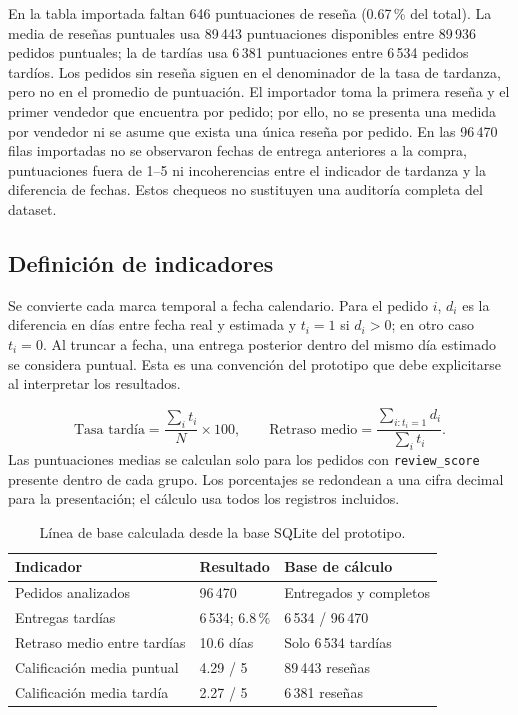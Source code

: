 \documentclass[12pt,a4paper]{article}
\begin{document}
En la tabla importada faltan 646 puntuaciones de reseña (0.67\,\% del total). La media de reseñas puntuales usa 89\,443 puntuaciones disponibles entre 89\,936 pedidos puntuales; la de tardías usa 6\,381 puntuaciones entre 6\,534 pedidos tardíos. Los pedidos sin reseña siguen en el denominador de la tasa de tardanza, pero no en el promedio de puntuación. El importador toma la primera reseña y el primer vendedor que encuentra por pedido; por ello, no se presenta una medida por vendedor ni se asume que exista una única reseña por pedido. En las 96\,470 filas importadas no se observaron fechas de entrega anteriores a la compra, puntuaciones fuera de 1--5 ni incoherencias entre el indicador de tardanza y la diferencia de fechas. Estos chequeos no sustituyen una auditoría completa del dataset.

\subsection{Definición de indicadores}
Se convierte cada marca temporal a fecha calendario. Para el pedido $i$, $d_i$ es la diferencia en días entre fecha real y estimada y $t_i=1$ si $d_i>0$; en otro caso $t_i=0$. Al truncar a fecha, una entrega posterior dentro del mismo día estimado se considera puntual. Esta es una convención del prototipo que debe explicitarse al interpretar los resultados.

\begin{equation}
\text{Tasa tardía}=\frac{\sum_i t_i}{N}\times100,\qquad
\text{Retraso medio}=\frac{\sum_{i:t_i=1}d_i}{\sum_i t_i}.
\end{equation}
Las puntuaciones medias se calculan solo para los pedidos con \texttt{review\_score} presente dentro de cada grupo. Los porcentajes se redondean a una cifra decimal para la presentación; el cálculo usa todos los registros incluidos.

\begin{table}[H]
\centering\small
\begin{tabularx}{\textwidth}{Y P{3.2cm} P{3.1cm}}
\toprule
Indicador & Resultado & Base de cálculo\\
\midrule
Pedidos analizados & 96\,470 & Entregados y completos\\
Entregas tardías & 6\,534; 6.8\,\% & 6\,534 / 96\,470\\
Retraso medio entre tardías & 10.6 días & Solo 6\,534 tardías\\
Calificación media puntual & 4.29 / 5 & 89\,443 reseñas\\
Calificación media tardía & 2.27 / 5 & 6\,381 reseñas\\
\bottomrule
\end{tabularx}
\caption{Línea de base calculada desde la base SQLite del prototipo.}
\end{table}
\end{document}
